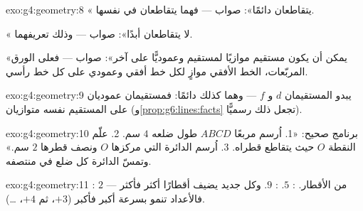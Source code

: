 \begin{solution}{exo:g4:geometry:8}
« يتقاطعان دائمًا»: صواب --- فهما يتقاطعان
في  نفسها.

« لا يتقاطعان أبدًا»: صواب --- وذلك تعريفهما.

«يمكن أن يكون مستقيم موازيًا لمستقيم وعموديًّا على
آخر»: صواب --- فعلى الورق المربّعات، الخط الأفقي موازٍ
لكل خط أفقي وعمودي على كل خط رأسي.
\end{solution}

\begin{solution}{exo:g4:geometry:9}
يبدو المستقيمان $d$ و $f$  --- وهما كذلك دائمًا: فمستقيمان
عموديان على المستقيم نفسه متوازيان
(و\cref{prop:g6:lines:facts} تجعل ذلك رسميًّا).
\end{solution}

\begin{solution}{exo:g4:geometry:10}
برنامج صحيح: «1. اُرسم مربعًا $ABCD$ طول ضلعه $4$ سم.
2. علّم النقطة $O$ حيث يتقاطع قطراه. 3. اُرسم الدائرة
التي مركزها $O$ ونصف قطرها $2$ سم.» وتمسّ الدائرة كل ضلع في
منتصفه.
\end{solution}

\begin{solution}{exo:g4:geometry:11}
: $2$ من الأقطار. : $5$. : $9$. وكل 
جديد يضيف أقطارًا أكثر فأكثر --- فالأعداد تنمو بسرعة أكبر
فأكبر ($+3$، ثم $+4$، \dots).
\end{solution}
